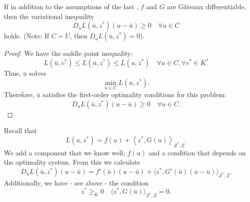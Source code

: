 \documentclass[../skript.tex]{subfiles}
\begin{document}
\begin{theorem}
If in addition to the assumptions of the last , $f$ and $G$ are Gâteaux differentiable, then the variational inequality
\[
	D_u L \left( \bar{u}, z^* \right) \left( u - \bar{u} \right) \geq 0 \quad \forall u \in C
\]
holds.
(Note: If $C = U$, then $D_u L(\bar{u}, z^*) = 0$).
\end{theorem}
\begin{proof}
We have the saddle point inequality:
\[
	L(\bar{u}, v^*) \leq L(\bar{u}, z^*) \leq L(u, z^*) \quad \forall u \in C, \forall v^* \in K^*
\]
Thus, $\bar{u}$ solves
\[
	\min_{u \in C} L(u, z^*).
\]
Therefore, $\bar{u}$ satisfies the first-order optimality conditions for this problem:
\[
	D_u L(\bar{u}, z^*) (u - \bar{u}) \geq 0 \quad \forall u \in C.
\]
\end{proof}
Recall that
\[
L(u, z^*) = f(u) + \left\langle z^*, G(u) \right\rangle_{Z^*, Z}.
\]
We add a component that we know well, $f(u)$ and a condition that depends on the optimality system. From this we calculate
\[
	D_u L(\bar{u}, z^*) ( u - \bar{u}) = f'(\bar{u})(u - \bar{u}) + \langle z^*, G'(\bar{u})(u - \bar{u}) \rangle_{Z^*, Z}.
\]
Additionally, we have - see above - the condition
\[
	z^* \geq_K 0 \quad \langle z^*, G(\bar{u}) \rangle_{Z^*, Z} = 0.
\]
\end{document}
